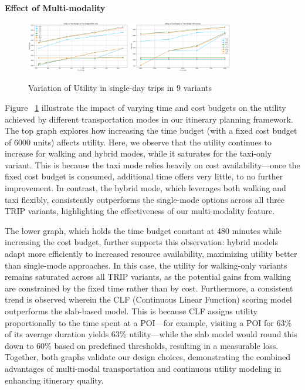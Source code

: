 \noindent\textbf{Effect of Multi-modality}

\begin{figure}[H]
\includegraphics[width=0.4\textwidth]{plots/multimodality1.png}
\label{fig:mm1}
\includegraphics[width=0.4\textwidth]{plots/multimodality2.png}
\caption{Variation of Utility in single-day trips in 9 variants}
\label{fig:mm2}
\end{figure}

Figure ~\ref{fig:mm2} illustrate the impact of varying time and cost budgets on the utility achieved by different transportation modes in our itinerary planning framework. The top graph explores how increasing the time budget (with a fixed cost budget of 6000 units) affects utility. Here, we observe that the utility continues to increase for walking and hybrid modes, while it saturates for the taxi-only variant. This is because the taxi mode relies heavily on cost availability—once the fixed cost budget is consumed, additional time offers very little, to no further improvement. In contrast, the hybrid mode, which leverages both walking and taxi flexibly, consistently outperforms the single-mode options across all three TRIP variants, highlighting the effectiveness of our multi-modality feature.

The lower graph, which holds the time budget constant at 480 minutes while increasing the cost budget, further supports this observation: hybrid models adapt more efficiently to increased resource availability, maximizing utility better than single-mode approaches. In this case, the utility for walking-only variants remains saturated across all TRIP variants, as the potential gains from walking are constrained by the fixed time rather than by cost. Furthermore, a consistent trend is observed wherein the CLF (Continuous Linear Function) scoring model outperforms the slab-based model. This is because CLF assigns utility proportionally to the time spent at a POI—for example, visiting a POI for 63\% of its average duration yields 63\% utility—while the slab model would round this down to 60\% based on predefined thresholds, resulting in a measurable loss. Together, both graphs validate our design choices, demonstrating the combined advantages of multi-modal transportation and continuous utility modeling in enhancing itinerary quality.

